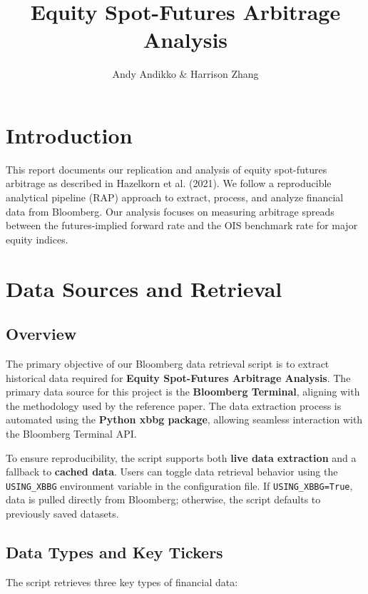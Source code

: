 \documentclass{article}
\title{Equity Spot-Futures Arbitrage Analysis}
\author{Andy Andikko \& Harrison Zhang}
\begin{document}
\maketitle

\sloppy 

\section{Introduction}
This report documents our replication and analysis of equity spot-futures arbitrage as described in Hazelkorn et al. (2021). We follow a reproducible analytical pipeline (RAP) approach to extract, process, and analyze financial data from Bloomberg. Our analysis focuses on measuring arbitrage spreads between the futures-implied forward rate and the OIS benchmark rate for major equity indices.

\section{Data Sources and Retrieval}
\subsection{Overview}
The primary objective of our Bloomberg data retrieval script is to extract historical data required for \textbf{Equity Spot-Futures Arbitrage Analysis}. The primary data source for this project is the \textbf{Bloomberg Terminal}, aligning with the methodology used by the reference paper. The data extraction process is automated using the \textbf{Python xbbg package}, allowing seamless interaction with the Bloomberg Terminal API.

To ensure reproducibility, the script supports both \textbf{live data extraction} and a fallback to \textbf{cached data}. Users can toggle data retrieval behavior using the \texttt{USING\_XBBG} environment variable in the configuration file. If \texttt{USING\_XBBG=True}, data is pulled directly from Bloomberg; otherwise, the script defaults to previously saved datasets.

\subsection{Data Types and Key Tickers}
The script retrieves three key types of financial data:
\end{document}
